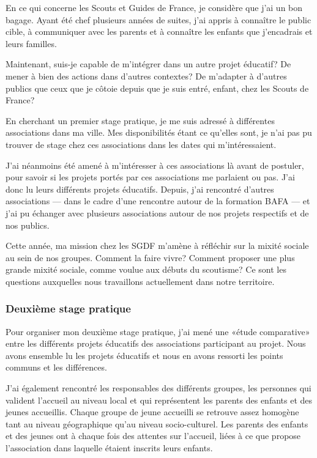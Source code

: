 \documentclass[titlepage,11pt,a4paper]{article}
\begin{document}
En ce qui concerne les Scouts et Guides de France, je considère que j'ai un bon bagage.
Ayant été chef plusieurs années de suites, j'ai appris à connaître le public cible, à
communiquer avec les parents et à connaître les enfants que j'encadrais et leurs familles.

Maintenant, suis-je capable de m'intégrer dans un autre projet éducatif? De mener à bien
des actions dans d'autres contextes? De m'adapter à d'autres publics que ceux que je
côtoie depuis que je suis entré, enfant, chez les Scouts de France?

En cherchant un premier stage pratique, je me suis
adressé à différentes associations dans ma ville. Mes disponibilités étant ce qu'elles
sont, je n'ai pas pu trouver de stage chez ces associations dans les dates qui m'intéressaient.

J'ai néanmoins été amené à m'intéresser à ces associations là avant de postuler, pour
savoir si les projets portés par ces associations me parlaient ou pas. J'ai donc lu leurs
différents projets éducatifs. Depuis, j'ai rencontré d'autres associations --- dans le cadre
d'une rencontre autour de la formation BAFA --- et j'ai pu échanger avec plusieurs
associations autour de nos projets respectifs et de nos publics.

Cette année, ma mission chez les SGDF m'amène à réfléchir sur la mixité sociale au sein de
nos groupes. Comment la faire vivre? Comment proposer une plus grande mixité sociale,
comme voulue aux débuts du scoutisme? Ce sont les questions auxquelles nous travaillons
actuellement dans notre territoire.

\subsubsection{Deuxième stage pratique}

Pour organiser mon deuxième stage pratique, j'ai mené une «étude comparative» entre les
différents projets éducatifs des associations participant au projet. Nous avons ensemble
lu les projets éducatifs et nous en avons ressorti les points communs et les différences.

J'ai également rencontré les responsables des différents groupes, les personnes qui
valident l'accueil au niveau local et qui représentent les parents des enfants et des
jeunes accueillis. Chaque groupe de jeune accueilli se retrouve assez homogène tant au niveau
géographique qu'au niveau socio-culturel. Les parents des enfants et des jeunes ont à
chaque fois des attentes sur l'accueil, liées à ce que propose l'association dans laquelle
étaient inscrits leurs enfants.
\end{document}
